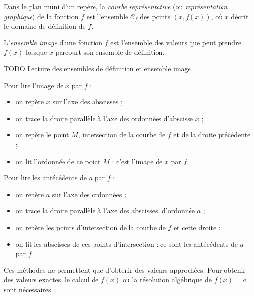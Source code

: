 \begin{definition}
  Dans le plan muni d'un repère, la \emph{courbe représentative} (ou \emph{représentation graphique}) de la fonction $f$ est l'ensemble $\mathcal{C}_f$ des points $(x, f(x))$, où $x$ décrit le domaine de définition de $f$.
\end{definition}

\begin{definition}
  L'\emph{ensemble image} d'une fonction $f$ est l'ensemble des valeurs que peut prendre $f(x)$ lorsque $x$ parcourt son ensemble de définition.
\end{definition}

\begin{methode}
  TODO Lecture des ensembles de définition et ensemble image
\end{methode}

\begin{methode}
  Pour lire l'image de $x$ par $f$ :
  \begin{itemize}
    \item on repère $x$ sur l'axe des abscisses ;
    \item on trace la droite parallèle à l'axe des ordonnées d'abscisse $x$ ;
    \item on repère le point $M$, intersection de la courbe de $f$ et de la droite précédente ;
    \item on lit l'ordonnée de ce point $M$ : c'est l'image de $x$ par $f$.
  \end{itemize}
\end{methode}

\begin{methode}
  Pour lire les antécédents de $a$ par $f$ :
  \begin{itemize}
    \item on repère $a$ sur l'axe des ordonnées ;
    \item on trace la droite parallèle à l'axe des abscisses, d'ordonnée $a$ ;
    \item on repère les points d'intersection de la courbe de $f$ et cette droite ;
    \item on lit les abscisses de ces points d'intersection : ce sont les antécédents de $a$ par $f$.
  \end{itemize}
\end{methode}

\begin{remarque}
  Ces méthodes ne permettent que d'obtenir des valeurs approchées. Pour obtenir des valeurs exactes, le calcul de $f(x)$ ou la résolution algébrique de $f(x)=a$ sont nécessaires.
\end{remarque}

